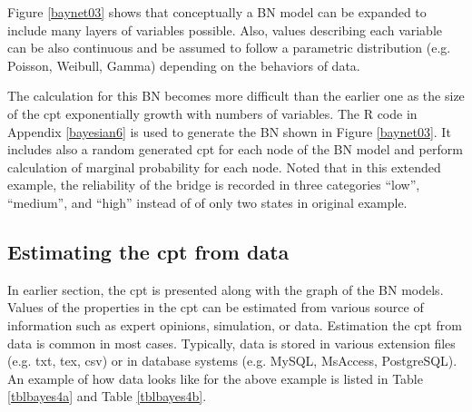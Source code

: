 Figure \ref{baynet03} shows that conceptually a BN model can be expanded to include many layers of variables possible. Also, values describing each variable can be also continuous and be assumed to follow a parametric distribution (e.g. Poisson, Weibull, Gamma) depending on the behaviors of data. 

The calculation for this BN becomes more difficult than the earlier one as the size of the cpt exponentially growth with numbers of variables. The R code in Appendix \ref{bayesian6} is used to generate the BN shown in Figure \ref{baynet03}. It includes also a random generated cpt for each node of the BN model and perform calculation of marginal probability for each node. Noted that in this extended example, the reliability of the bridge is recorded in three categories ``low'', ``medium'', and ``high'' instead of of only two states in original example.
\subsection{Estimating the cpt from data}
In earlier section, the cpt is presented along with the graph of the BN models. Values of the properties in the cpt can be estimated from various source of information such as expert opinions, simulation, or data. Estimation the cpt from data is common in most cases. Typically, data is stored in various extension files (e.g. txt, tex, csv) or in database systems (e.g. MySQL, MsAccess, PostgreSQL). An example of how data looks like for the above example is listed in Table \ref{tblbayes4a} and Table \ref{tblbayes4b}.

